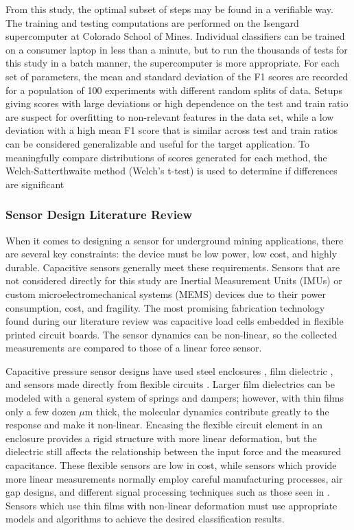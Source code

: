 From this study, the optimal subset of steps may be found in a verifiable way. The training and testing
 computations are performed on the Isengard supercomputer at Colorado School of Mines. Individual classifiers
can be trained on a consumer laptop in less than a minute, but to run the thousands of tests for this study
 in a batch manner, the supercomputer is more appropriate.
For each set of parameters, the mean and standard deviation of the F1 scores
 are recorded for a population of 100 experiments with different random splits of data.
Setups giving scores with large deviations or high dependence
 on the test and train ratio are suspect for overfitting to non-relevant features in the data set,
 while a low deviation with a high mean F1 score that is similar across test and train ratios can be 
 considered generalizable and useful for the target application.
To meaningfully compare distributions of scores generated for each method,
 the Welch-Satterthwaite method (Welch's t-test) is used to determine 
 if differences are significant \cite{tamhane2000statistics}

\subsubsection{Sensor Design Literature Review}
When it comes to designing a sensor for underground mining applications,
 there are several key constraints: the device must be low power, low cost,
 and highly durable. Capacitive sensors generally meet these requirements.
Sensors that are not considered directly for this study are Inertial Measurement Units (IMUs)
 or custom microelectromechanical systems (MEMS) devices due to their power consumption, cost, and fragility.
The most promising fabrication technology found during our literature review was
 capacitive load cells embedded in flexible printed circuit boards.
The sensor dynamics can be non-linear, so the collected measurements 
 are compared to those of a linear force sensor. 

Capacitive pressure sensor designs have used
 steel enclosures \cite{lee16}, film dielectric \cite{bodini18},
 and sensors made directly from flexible circuits \cite{lee08}.
Larger film dielectrics can be modeled with a general system of springs and dampers;
 however, with thin films only a few dozen $\mu$m thick, the molecular dynamics
 contribute greatly to the response \cite{willam02} and make it non-linear.
Encasing the flexible circuit element in an enclosure provides a rigid structure
 with more linear deformation, but the dielectric still affects the relationship
 between the input force and the measured capacitance.
These flexible sensors are low in cost,
 while sensors which provide more linear measurements normally employ careful
 manufacturing processes, air gap designs,
 and different signal processing techniques such as those seen in
\cite{barile19,Lu16,Zaitsev17,Prit19,Liu16}.
Sensors which use thin films with non-linear deformation must use appropriate models
 and algorithms to achieve the desired classification results.

